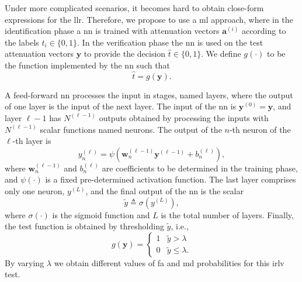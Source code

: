 \documentclass[conference,draftcls,onecolumn]{IEEEtran}
\begin{document}
Under more complicated scenarios, it becomes hard to obtain close-form expressions for the \ac{llr}. Therefore, we propose to use a \ac{ml} approach, where in the identification phase a \ac{nn} is trained with attenuation vectors $\bm{a}^{(i)}$ according to the labels $t_i \in \{0,1\}$. In the verification phase the \ac{nn} is used on the test attenuation vectors $\bm{y}$ to provide the decision $\hat{t} \in \{0,1\}$. We define $g(\cdot)$ to be the function implemented by the \ac{nn} such that
 \begin{equation}
 	\hat{t} = g(\bm{y}).	
 \end{equation}

A feed-forward \ac{nn} processes the input in stages, named layers, where the output of one layer is the input of the next layer. The input of the \ac{nn} is $\bm{y}^{(0)} = \bm{y}$, and layer $\ell-1$ has $N^{(\ell-1)}$ outputs obtained by processing the inputs with $N^{(\ell-1)}$ scalar functions named neurons. The output of the $n$-th neuron of the $\ell$-th layer is
\begin{equation}\label{eq:nonLin}
y_n^{(\ell)} = \psi\left( \bm{w}_n^{(\ell -1)}\bm{y}^{(\ell-1)}+b_n^{(\ell)} \right),
\end{equation}
where $\bm{w}_n^{(\ell -1)}$ and $b_n^{(\ell)}$ are coefficients to be determined in the training phase, and $\psi(\cdot)$ is a fixed pre-determined activation function. 
The last layer comprises only one neuron, $y^{(L)}$, and the final output of the \ac{nn} is the scalar 
\begin{equation}
	\tilde{y} \triangleq \sigma(y^{(L)}),	
\end{equation}
where $\sigma(\cdot)$ is the sigmoid function and $L$ is the total number of layers. Finally, the test function is obtained by thresholding $\tilde{y}$, i.e.,
\begin{equation}
\label{eq:decNN}
    g(\bm{y}) = \begin{cases}
    1 & \tilde{y} > \lambda \\
    0 & \tilde{y} \leq \lambda.
    \end{cases}
\end{equation}
By varying $\lambda$ we obtain different values of \ac{fa} and \ac{md} probabilities for this \ac{irlv} test.
\end{document}
